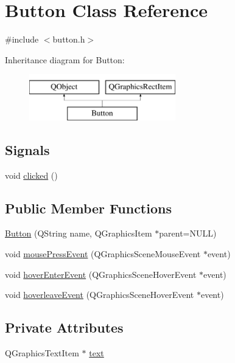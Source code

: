 \hypertarget{class_button}{}\section{Button Class Reference}
\label{class_button}


{\ttfamily \#include $<$button.\+h$>$}

Inheritance diagram for Button\+:\begin{figure}[H]
\begin{center}
\leavevmode
\includegraphics[height=2.000000cm]{class_button}
\end{center}
\end{figure}
\subsection*{Signals}
\begin{DoxyCompactItemize}
\item 
void \hyperlink{class_button_a9e7ab4152cb1e7e3beb7f2842f32670c}{clicked} ()
\end{DoxyCompactItemize}
\subsection*{Public Member Functions}
\begin{DoxyCompactItemize}
\item 
\hyperlink{class_button_a69976e5c00874a3807b642f249c1c776}{Button} (Q\+String name, Q\+Graphics\+Item $\ast$parent=N\+U\+LL)
\item 
void \hyperlink{class_button_a17d8eb0c904605b223bbc00c75655315}{mouse\+Press\+Event} (Q\+Graphics\+Scene\+Mouse\+Event $\ast$event)
\item 
void \hyperlink{class_button_a633a9684818bc5d300a622a00064f09c}{hover\+Enter\+Event} (Q\+Graphics\+Scene\+Hover\+Event $\ast$event)
\item 
void \hyperlink{class_button_ac7902a801be3eb542ce86e9c4cf4740d}{hoverleave\+Event} (Q\+Graphics\+Scene\+Hover\+Event $\ast$event)
\end{DoxyCompactItemize}
\subsection*{Private Attributes}
\begin{DoxyCompactItemize}
\item 
Q\+Graphics\+Text\+Item $\ast$ \hyperlink{class_button_a0d566bacc8c1befef9d09b839b6e76e6}{text}
\end{DoxyCompactItemize}


